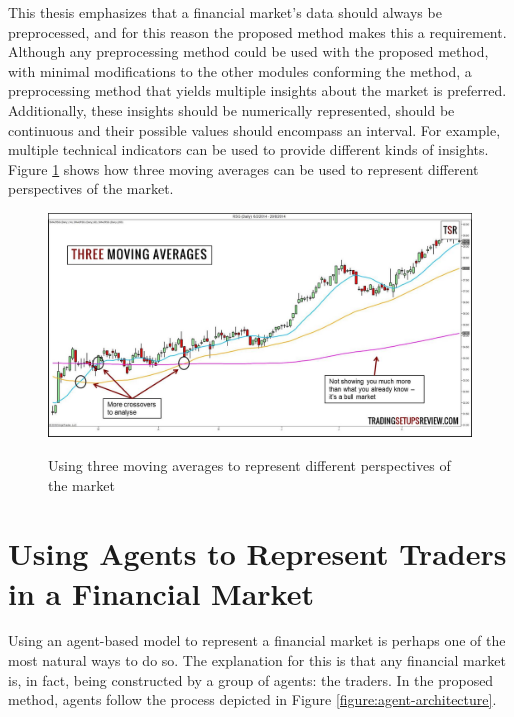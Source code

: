 This thesis emphasizes that a financial market's data should always be
preprocessed, and for this reason the proposed method makes this a
requirement. Although any preprocessing method could be used with the proposed
method, with minimal modifications to the other modules conforming the method, a
preprocessing method that yields multiple insights about the market is
preferred. Additionally, these insights should be numerically represented,
should be continuous and their possible values should encompass an interval. For
example, multiple technical indicators can be used to provide different kinds of
insights. Figure \ref{figure:multiple-technical-indicators} shows how three moving
averages can be used to represent different perspectives of the market.

\begin{figure}
\caption{Using three moving averages to represent different perspectives of the market} \centering
\includegraphics[width=1.0\textwidth]{img/multiple-technical-indicators.jpg}
\label{figure:multiple-technical-indicators}
\end{figure}


\section{Using Agents to Represent Traders in a Financial Market}
\label{section:using-agents-to-represent-traders-in-a-financial-market}

Using an agent-based model to represent a financial market is perhaps one of the
most natural ways to do so. The explanation for this is that any financial
market is, in fact, being constructed by a group of agents: the traders. In the
proposed method, agents follow the process depicted in Figure
\ref{figure:agent-architecture}.


